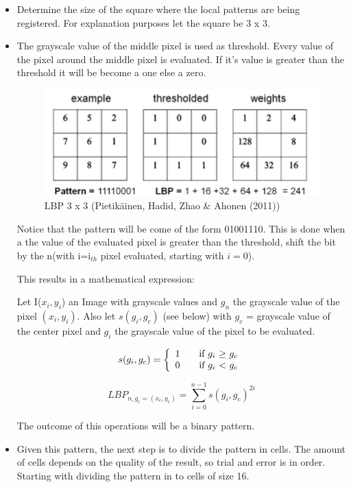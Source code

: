 \documentclass[a4paper]{article}
\begin{document}
\begin{itemize}
\item Determine the size of the square where the local patterns are being
registered. For explanation purposes let the square be 3 x 3. \\
\item The grayscale value of the middle pixel is used as threshold. Every
value of the pixel around the middle pixel is evaluated. If it's value is
greater than the threshold it will be become a one else a zero.

\begin{figure}[H]
\center
\includegraphics[scale=0.5]{lbp.png}
\caption{LBP 3 x 3 (Pietik\"ainen, Hadid, Zhao \& Ahonen (2011))}
\end{figure}

Notice that the pattern will be come of the form 01001110. This is done when a
the value of the evaluated pixel is greater than the threshold, shift the bit
by the n(with i=i$_{th}$ pixel evaluated, starting with $i=0$).

This results in a mathematical expression:

Let I($x_i, y_i$) an Image with grayscale values and $g_n$ the grayscale value
of the pixel $(x_i, y_i)$. Also let $s(g_i, g_c)$ (see below) with $g_c$ =
grayscale value of the center pixel and $g_i$ the grayscale value of the pixel
to be evaluated.

$$
  s(g_i, g_c) = \left\{
  \begin{array}{l l}
    1 & \quad \text{if $g_i$ $\geq$ $g_c$}\\
    0 & \quad \text{if $g_i$ $<$ $g_c$}\\
  \end{array} \right.
$$

$$LBP_{n, g_c = (x_c, y_c)} = \sum\limits_{i=0}^{n-1} s(g_i, g_c)^{2i} $$

The outcome of this operations will be a binary pattern.

\item Given this pattern, the next step is to divide the pattern in cells. The
amount of cells depends on the quality of the result, so trial and error is in
order. Starting with dividing the pattern in to cells of size 16. 


\end{itemize}
\end{document}
